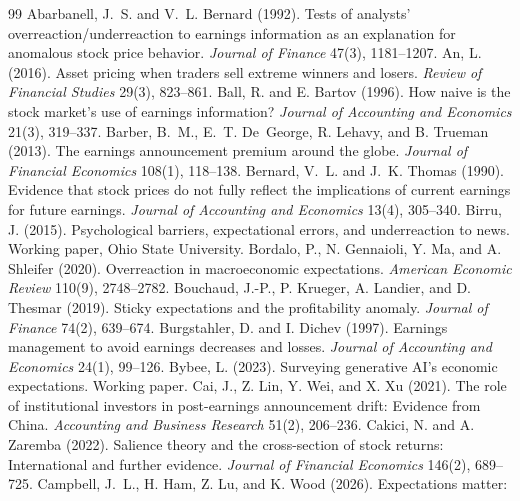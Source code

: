\documentclass[10pt]{article}
\begin{document}
\begin{thebibliography}{99}
 Abarbanell, J.~S. and V.~L. Bernard (1992). Tests of analysts'
overreaction/underreaction to earnings information as an explanation for anomalous stock price behavior.
\emph{Journal of Finance} 47(3), 1181--1207.
 An, L. (2016). Asset pricing when traders sell extreme winners and losers. \emph{Review of
Financial Studies} 29(3), 823--861.
 Ball, R. and E. Bartov (1996). How naive is the stock market's use of
earnings information? \emph{Journal of Accounting and Economics} 21(3), 319--337.
 Barber, B.~M., E.~T. De~George, R. Lehavy, and B. Trueman (2013). The
earnings announcement premium around the globe. \emph{Journal of Financial Economics} 108(1), 118--138.
 Bernard, V.~L. and J.~K. Thomas (1990). Evidence that stock prices
do not fully reflect the implications of current earnings for future earnings. \emph{Journal of Accounting and
Economics} 13(4), 305--340.
 Birru, J. (2015). Psychological barriers, expectational errors, and underreaction to
news. Working paper, Ohio State University.
 Bordalo, P., N. Gennaioli, Y. Ma, and A. Shleifer (2020). Overreaction in
macroeconomic expectations. \emph{American Economic Review} 110(9), 2748--2782.
 Bouchaud, J.-P., P. Krueger, A. Landier, and D. Thesmar (2019). Sticky
expectations and the profitability anomaly. \emph{Journal of Finance} 74(2), 639--674.
 Burgstahler, D. and I. Dichev (1997). Earnings management to
avoid earnings decreases and losses. \emph{Journal of Accounting and Economics} 24(1), 99--126.
 Bybee, L. (2023). Surveying generative AI's economic expectations. Working paper.
 Cai, J., Z. Lin, Y. Wei, and X. Xu (2021). The role of institutional investors in
post-earnings announcement drift: Evidence from China. \emph{Accounting and Business Research} 51(2), 206--236.
 Cakici, N. and A. Zaremba (2022). Salience theory and the
cross-section of stock returns: International and further evidence. \emph{Journal of Financial Economics} 146(2),
689--725.
 Campbell, J.~L., H. Ham, Z. Lu, and K. Wood (2026). Expectations matter:

\end{thebibliography}
\end{document}
